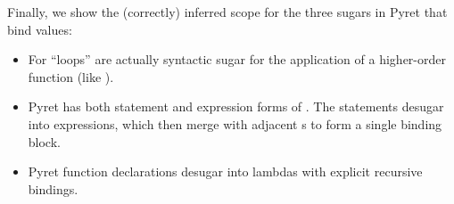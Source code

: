   Finally, we show the (correctly) inferred scope for the three sugars
  in Pyret that bind values:
  \begin{itemize}
  
  \item For ``loops'' are actually syntactic sugar for the application of a
    higher-order function (like ).
  
  \item Pyret has both statement and expression forms of . The
    statements desugar into  expressions, which then merge
    with adjacent s to form a single binding block.
  
  \item Pyret function declarations desugar into lambdas with explicit
    recursive bindings.
  
  \end{itemize}
  
